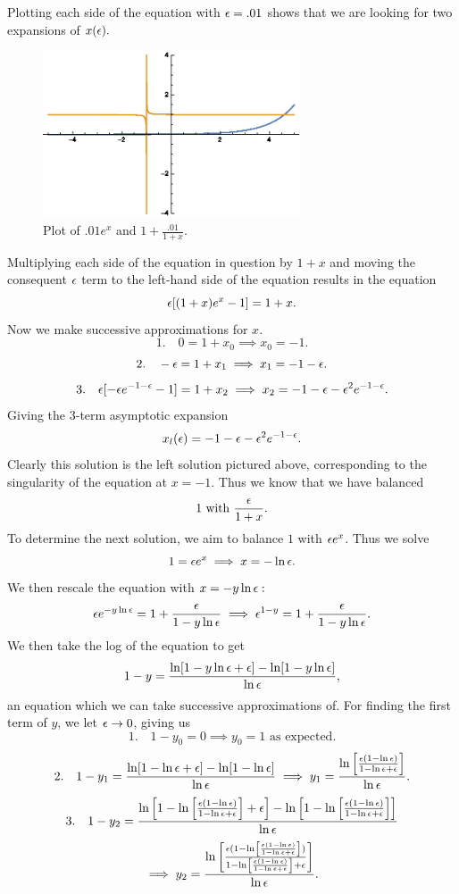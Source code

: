 \item Plotting each side of the equation with $\epsilon=.01$ shows that we are looking for two expansions of $x(\epsilon).$
\begin{figure}[h]
  \centering
  \includegraphics[width=3in]{test1no1prtb}
  \caption{Plot of $.01e^x$ and $1+\frac{.01}{1+x}$.}
\end{figure}
    
    Multiplying each side of the equation in question by $1+x$ and moving the consequent $\epsilon$ term to the left-hand side of the equation results in the equation
    $$\epsilon[(1+x)e^x-1]=1+x.$$
    Now we make successive approximations for $x$. 
    $$1.\quad 0=1+x_0\implies x_0=-1.$$
    $$2.\quad -\epsilon=1+x_1\implies x_1=-1-\epsilon.$$
    $$3.\quad \epsilon[-\epsilon e^{-1-\epsilon}-1]=1+x_2\implies x_2=-1-\epsilon-\epsilon^2 e^{-1-\epsilon}.$$
    Giving the 3-term asymptotic expansion
    $$x_l(\epsilon)=-1-\epsilon-\epsilon^2 e^{-1-\epsilon}.$$
    Clearly this solution is the left solution pictured above, corresponding to the singularity of the equation at $x=-1.$ Thus we know that we have balanced
    $$1\text{ with }\frac{\epsilon}{1+x}.$$
    To determine the next solution, we aim to balance $1$ with $\epsilon e^x$. Thus we solve
    $$1=\epsilon e^x\implies x=-\ln\epsilon.$$
    We then rescale the equation with $x=-y\ln\epsilon:$
    $$\epsilon e^{-y\ln\epsilon}=1+\frac{\epsilon}{1-y\ln\epsilon}\implies \epsilon^{1-y}=1+\frac{\epsilon}{1-y\ln\epsilon}.$$
    We then take the log of the equation to get 
    $$1-y=\frac{\ln[1-y\ln\epsilon+\epsilon]-\ln[1-y\ln\epsilon]}{\ln\epsilon},$$
    an equation which we can take successive approximations of.
    For finding the first term of $y$, we let $\epsilon\to 0$, giving us
    $$1.\quad 1-y_0=0\implies y_0=1\text{ as expected.}$$
    $$2.\quad 1-y_1=\frac{\ln[1-\ln\epsilon+\epsilon]-\ln[1-\ln\epsilon]}{\ln\epsilon}\implies y_1=\frac{\ln\left[\frac{\epsilon(1-\ln\epsilon)}{1-\ln\epsilon+\epsilon}\right]}{\ln\epsilon}.$$
    $$3.\quad 1-y_2=\frac{\ln\left[1-\ln\left[\frac{\epsilon(1-\ln\epsilon)}{1-\ln\epsilon+\epsilon}\right]+\epsilon\right]-\ln\left[1-\ln\left[\frac{\epsilon(1-\ln\epsilon)}{1-\ln\epsilon+\epsilon}\right]\right]}{\ln\epsilon}$$
    $$\implies y_2=\frac{\ln\left[\frac{\epsilon(1-\ln\left[\frac{\epsilon(1-\ln\epsilon)}{1-\ln\epsilon+\epsilon}\right])}{1-\ln\left[\frac{\epsilon(1-\ln\epsilon)}{1-\ln\epsilon+\epsilon}\right]+\epsilon}\right]}{\ln\epsilon}.$$
    
